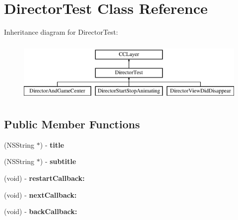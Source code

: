 \hypertarget{interface_director_test}{\section{Director\-Test Class Reference}
\label{interface_director_test}
}
Inheritance diagram for Director\-Test\-:\begin{figure}[H]
\begin{center}
\leavevmode
\includegraphics[height=3.000000cm]{interface_director_test}
\end{center}
\end{figure}
\subsection*{Public Member Functions}
\begin{DoxyCompactItemize}
\item 
\hypertarget{interface_director_test_a8ac9198fc3a121cd7a9050b61d37dfb9}{(N\-S\-String $\ast$) -\/ {\bfseries title}}\label{interface_director_test_a8ac9198fc3a121cd7a9050b61d37dfb9}

\item 
\hypertarget{interface_director_test_a2dda7e3687a6fb74473b9061342852a7}{(N\-S\-String $\ast$) -\/ {\bfseries subtitle}}\label{interface_director_test_a2dda7e3687a6fb74473b9061342852a7}

\item 
\hypertarget{interface_director_test_ad9377a3ba20bfa9d21b502041e337d6f}{(void) -\/ {\bfseries restart\-Callback\-:}}\label{interface_director_test_ad9377a3ba20bfa9d21b502041e337d6f}

\item 
\hypertarget{interface_director_test_ad933957eed831b3b0a9963a54f0c2f75}{(void) -\/ {\bfseries next\-Callback\-:}}\label{interface_director_test_ad933957eed831b3b0a9963a54f0c2f75}

\item 
\hypertarget{interface_director_test_a74233c334b3b95241d260f4c3351afc7}{(void) -\/ {\bfseries back\-Callback\-:}}\label{interface_director_test_a74233c334b3b95241d260f4c3351afc7}

\end{DoxyCompactItemize}
